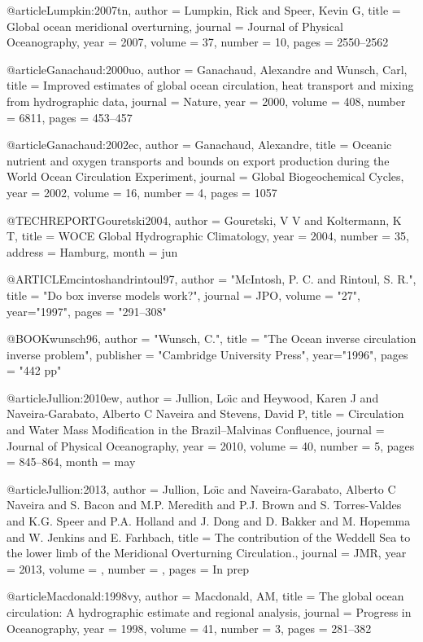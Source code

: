 @article{Lumpkin:2007tn,
author = {Lumpkin, Rick and Speer, Kevin G},
title = {{Global ocean meridional overturning}},
journal = {Journal of Physical Oceanography},
year = {2007},
volume = {37},
number = {10},
pages = {2550--2562}
}

@article{Ganachaud:2000uo,
author = {Ganachaud, Alexandre and Wunsch, Carl},
title = {{Improved estimates of global ocean circulation, heat transport and mixing from hydrographic data}},
journal = {Nature},
year = {2000},
volume = {408},
number = {6811},
pages = {453--457}
}

@article{Ganachaud:2002ec,
author = {Ganachaud, Alexandre},
title = {{Oceanic nutrient and oxygen transports and bounds on export production during the World Ocean Circulation Experiment}},
journal = {Global Biogeochemical Cycles},
year = {2002},
volume = {16},
number = {4},
pages = {1057}
}

@TECHREPORT{Gouretski2004,
author = {Gouretski, V V and Koltermann, K T},
title = {{WOCE Global Hydrographic Climatology}},
year = {2004},
number = {35},
address = {Hamburg},
month = jun
}

@ARTICLE{mcintoshandrintoul97,
author = "McIntosh, P. C. and Rintoul, S. R.",
title = "{Do box inverse models work?}",
journal = JPO,
volume = "27",
year="1997",
pages = "291--308" }

@BOOK{wunsch96,
author = "Wunsch, C.",
title = "{The Ocean inverse circulation inverse problem}",
publisher = "Cambridge University Press",
year="1996",
pages = "442 pp" 
}

@article{Jullion:2010ew,
author = {Jullion, Lo{\"\i}c and Heywood, Karen J and Naveira-Garabato, Alberto C Naveira and Stevens, David P},
title = {{Circulation and Water Mass Modification in the Brazil--Malvinas Confluence}},
journal = {Journal of Physical Oceanography},
year = {2010},
volume = {40},
number = {5},
pages = {845--864},
month = may
}

@article{Jullion:2013,
author = {Jullion, Lo{\"\i}c and Naveira-Garabato, Alberto C Naveira and S. Bacon and M.P. Meredith and P.J. Brown and S. Torres-Valdes and K.G. Speer and P.A. Holland and J. Dong and D. Bakker and M. Hopemma and W. Jenkins and E. Farhbach},
title = {{The contribution of the Weddell Sea to the lower limb of the Meridional Overturning Circulation.}},
journal = JMR,
year = {2013},
volume = {},
number = {},
pages = {In prep}
}

@article{Macdonald:1998vy,
author = {Macdonald, AM},
title = {{The global ocean circulation: A hydrographic estimate and regional analysis}},
journal = {Progress in Oceanography},
year = {1998},
volume = {41},
number = {3},
pages = {281--382}
}

